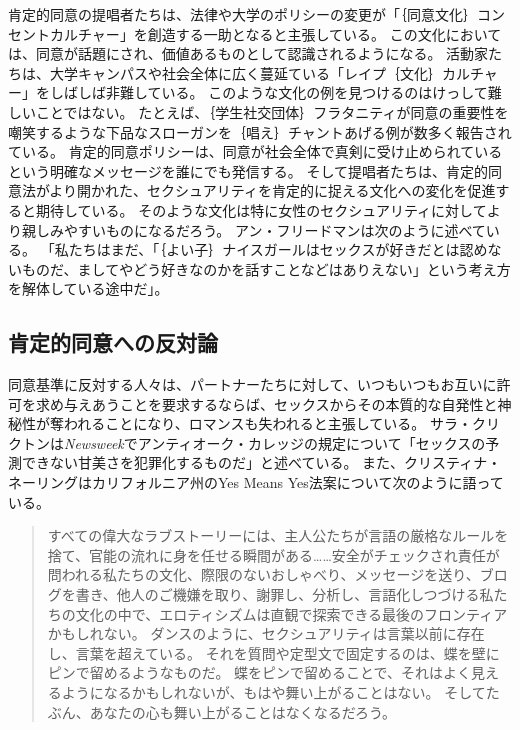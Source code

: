 \documentclass[paper=a4,book,openany]{jlreq}
\newcommand{\ig}[1]{}           %
\begin{document}
肯定的同意の提唱者たちは、法律や大学のポリシーの変更が「｛同意文化｝{コンセントカルチャー}」を創造する一助となると主張している。
この文化においては、同意が話題にされ、価値あるものとして認識されるようになる。
活動家たちは、大学キャンパスや社会全体に広く蔓延ている「レイプ｛文化｝{カルチャー}」をしばしば非難している。
このような文化の例を見つけるのはけっして難しいことではない。
たとえば、｛学生社交団体｝{フラタニティ}が同意の重要性を嘲笑するような下品なスローガンを｛唱え｝{チャント}あげる例が数多く報告されている\citep{jackson18:_frat_barred_yale_years_is_back}。
肯定的同意ポリシーは、同意が社会全体で真剣に受け止められているという明確なメッセージを誰にでも発信する。
そして提唱者たちは、肯定的同意法がより開かれた、セクシュアリティを肯定的に捉える文化への変化を促進すると期待している。
そのような文化は特に女性のセクシュアリティに対してより親しみやすいものになるだろう。
アン・フリードマン\ig{Ann Friedman}は次のように述べている。
「私たちはまだ、「｛よい子｝{ナイスガール}はセックスが好きだとは認めないものだ、ましてやどう好きなのかを話すことなどはありえない」という考え方を解体している途中だ」\citep{friedman14:_oh_yes_means_yes}。

\subsection{肯定的同意への反対論}

同意基準に反対する人々は、パートナーたちに対して、いつもいつもお互いに許可を求め与えあうことを要求するならば、セックスからその本質的な自発性と神秘性が奪われることになり、ロマンスも失われると主張している。
サラ・クリクトンは\emph{Newsweek}でアンティオーク・カレッジの規定について「セックスの予測できない甘美さを犯罪化するものだ」と述べている\citep{crichton93:_sexual_correc}。
また、クリスティナ・ネーリングはカリフォルニア州のYes Means Yes法案について次のように語っている。

\begin{quote}

すべての偉大なラブストーリーには、主人公たちが言語の厳格なルールを捨て、官能の流れに身を任せる瞬間がある……安全がチェックされ責任が問われる私たちの文化、際限のないおしゃべり、メッセージを送り、ブログを書き、他人のご機嫌を取り、謝罪し、分析し、言語化しつづける私たちの文化の中で、エロティシズムは直観で探索できる最後のフロンティアかもしれない。
ダンスのように、セクシュアリティは言葉以前に存在し、言葉を超えている。
それを質問や定型文で固定するのは、蝶を壁にピンで留めるようなものだ。
蝶をピンで留めることで、それはよく見えるようになるかもしれないが、もはや舞い上がることはない。
そしてたぶん、あなたの心も舞い上がることはなくなるだろう。
\citep{nehring15:_are_today_legal_defin_rape}
\end{quote}
\end{document}
